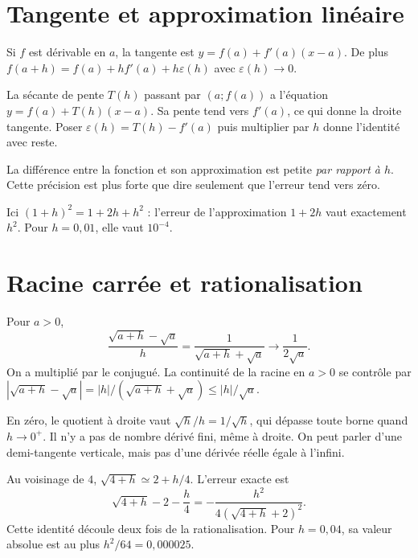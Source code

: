 \documentclass[../cours_1re.tex]{subfiles}
\begin{document}
\section{Tangente et approximation linéaire}
\begin{theoreme}
Si $f$ est dérivable en $a$, la tangente est
$y=f(a)+f'(a)(x-a)$.
De plus $f(a+h)=f(a)+hf'(a)+h\varepsilon(h)$ avec $\varepsilon(h)\to0$.
\end{theoreme}
\begin{demonstration}
La sécante de pente $T(h)$ passant par $(a;f(a))$ a l'équation $y=f(a)+T(h)(x-a)$. Sa pente tend vers $f'(a)$, ce qui donne la droite tangente.
Poser $\varepsilon(h)=T(h)-f'(a)$ puis multiplier par $h$ donne l'identité avec reste.
\end{demonstration}
La différence entre la fonction et son approximation est petite \emph{par rapport à $h$}. Cette précision est plus forte que dire seulement que l'erreur tend vers zéro.
\begin{center}
\end{center}
Ici $(1+h)^2=1+2h+h^2$ : l'erreur de l'approximation $1+2h$ vaut exactement $h^2$. Pour $h=0{,}01$, elle vaut $10^{-4}$.
\section{Racine carrée et rationalisation}
\begin{demonstration}
Pour $a>0$,
\[
\frac{\sqrt{a+h}-\sqrt a}{h}
=\frac1{\sqrt{a+h}+\sqrt a}\longrightarrow\frac1{2\sqrt a}.
\]
On a multiplié par le conjugué. La continuité de la racine en $a>0$ se contrôle par
$|\sqrt{a+h}-\sqrt a|=|h|/(\sqrt{a+h}+\sqrt a)\le|h|/\sqrt a$.
\end{demonstration}
En zéro, le quotient à droite vaut $\sqrt h/h=1/\sqrt h$, qui dépasse toute borne quand $h\to0^+$. Il n'y a pas de nombre dérivé fini, même à droite. On peut parler d'une demi-tangente verticale, mais pas d'une dérivée réelle égale à l'infini.
\begin{exemple}
Au voisinage de $4$, $\sqrt{4+h}\simeq2+h/4$.
L'erreur exacte est
\[
\sqrt{4+h}-2-\frac h4
=-\frac{h^2}{4(\sqrt{4+h}+2)^2}.
\]
Cette identité découle deux fois de la rationalisation. Pour $h=0{,}04$, sa valeur absolue est au plus $h^2/64=0{,}000025$.
\end{exemple}
\end{document}
